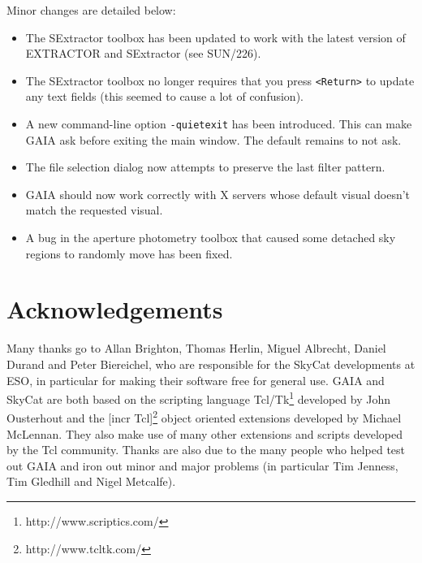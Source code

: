 \documentclass[twoside,11pt]{article}
\newcommand{\htmladdnormallinkfoot}[2]{#1\footnote{#2}}
\newcommand{\htmladdnormallink}[2]{#1}
\newcommand{\xref}[3]{#1}
\newcommand{\xlabel}[1]{}
\renewcommand{\_}{\texttt{\symbol{95}}}
\newcommand{\mytt}[1]{{\texttt{#1}}}
\begin{document}
  Minor changes are detailed below:
  \begin{itemize}

    \item The SExtractor toolbox has been updated to work with the
    latest version of EXTRACTOR and SExtractor (see
    \xref{SUN/226}{sun226}{}).

    \item The SExtractor toolbox no longer requires that you press
    \mytt{<Return>} to update any text fields (this seemed to cause a
    lot of confusion).

    \item A new command-line option \mytt{-quiet\_exit} has been
    introduced. This can make GAIA ask before exiting the main
    window. The default remains to not ask.

    \item The file selection dialog now attempts to preserve the last
    filter pattern.

    \item GAIA should now work correctly with X servers whose default
    visual doesn't match the requested visual.

    \item A bug in the aperture photometry toolbox that caused some
    detached sky regions to randomly move has been fixed.
  \end{itemize}

\section{\xlabel{acknowledgements}Acknowledgements}

Many thanks go to Allan Brighton, Thomas Herlin, Miguel Albrecht,
Daniel Durand and Peter Biereichel, who are responsible for the
\htmladdnormallink{SkyCat}{http://archive.eso.org/skycat/}
developments at ESO, in particular for making their software free for
general use.
GAIA and SkyCat are both based on the scripting language
\htmladdnormallinkfoot{Tcl/Tk}{http://www.scriptics.com/} developed by
John Ousterhout and the \htmladdnormallinkfoot{[incr Tcl]}
{http://www.tcltk.com/} object oriented extensions developed by
Michael McLennan.
They also make use of many other extensions and scripts developed by
the Tcl community.
Thanks are also due to the many people who helped test out GAIA and
iron out minor and major problems (in particular Tim Jenness, Tim
Gledhill and Nigel Metcalfe).

\end{document}

